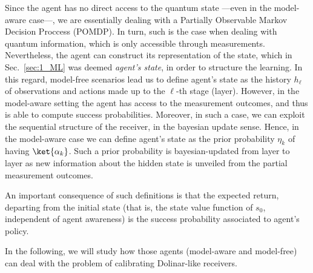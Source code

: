 Since the agent has no direct access to the quantum state ---even in the model-aware case---, we are essentially dealing with a Partially Observable Markov Decision Proccess (POMDP). In turn, such is the case when dealing with quantum information, which is only accessible through measurements. Nevertheless, the agent can construct its representation of the state, which in Sec.~\ref{sec:1_ML} was deemed \textit{agent's state}, in order to structure the learning. In this regard, model-free scenarios lead us to define agent's state as the history $h_\ell$ of observations and actions made up to the $\ell$-th stage (layer). However, in the model-aware setting the agent has access to the measurement outcomes, and thus is able to compute success probabilities. Moreover, in such a case, we can exploit the sequential structure of the receiver, in the bayesian update sense. Hence, in the model-aware case we can define agent's state as the prior probability $\eta_k$ of having $\ket{\alpha_k}$. Such a prior probability is bayesian-updated from layer to layer as new information about the hidden state is unveiled from the partial measurement outcomes.

An important consequence of such definitions is that the expected return, departing from the initial state (that is, the state value function of $s_0$, independent of agent awareness) is the success probability associated to agent's policy.

In the following, we will study how those agents (model-aware and model-free) can deal with the problem of calibrating Dolinar-like receivers.
